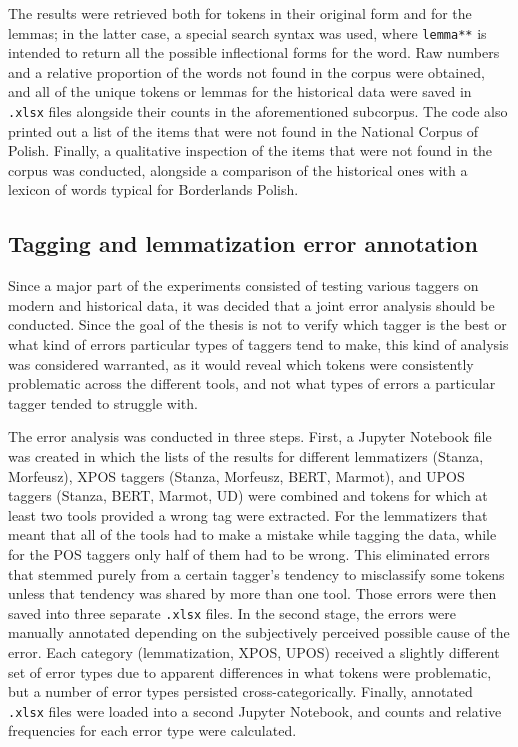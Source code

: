 The results were retrieved both for tokens in their original form and for the lemmas; in the latter case, a special search syntax was used, where \texttt{lemma**} is intended to return all the possible inflectional forms for the word. Raw numbers and a relative proportion of the words not found in the corpus were obtained, and all of the unique tokens or lemmas for the historical data were saved in \texttt{.xlsx} files alongside their counts in the aforementioned subcorpus. The code also printed out a list of the items that were not found in the National Corpus of Polish. Finally, a qualitative inspection of the items that were not found in the corpus was conducted, alongside a comparison of the historical ones with a lexicon of words typical for Borderlands Polish. 

\subsection{Tagging and lemmatization error annotation}
\label{subsec:error-annotation}

Since a major part of the experiments consisted of testing various taggers on modern and historical data, it was decided that a joint error analysis should be conducted. Since the goal of the thesis is not to verify which tagger is the best or what kind of errors particular types of taggers tend to make, this kind of analysis was considered warranted, as it would reveal which tokens were consistently problematic across the different tools, and not what types of errors a particular tagger tended to struggle with.

The error analysis was conducted in three steps. First, a Jupyter Notebook file was created in which the lists of the results for different lemmatizers (Stanza, Morfeusz), XPOS taggers (Stanza, Morfeusz, BERT, Marmot), and UPOS taggers (Stanza, BERT, Marmot, UD) were combined and tokens for which at least two tools provided a wrong tag were extracted. For the lemmatizers that meant that all of the tools had to make a mistake while tagging the data, while for the POS taggers only half of them had to be wrong. This eliminated errors that stemmed purely from a certain tagger's tendency to misclassify some tokens unless that tendency was shared by more than one tool. Those errors were then saved into three separate \texttt{.xlsx} files. In the second stage, the errors were manually annotated depending on the subjectively perceived possible cause of the error. Each category (lemmatization, XPOS, UPOS) received a slightly different set of error types due to apparent differences in what tokens were problematic, but a number of error types persisted cross-categorically. Finally, annotated \texttt{.xlsx} files were loaded into a second Jupyter Notebook, and counts and relative frequencies for each error type were calculated. 
